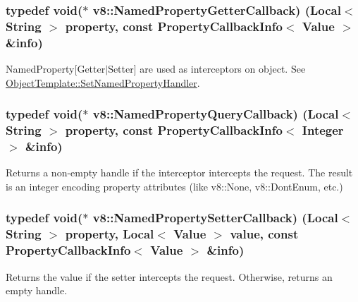\subsubsection[{\texorpdfstring{Named\+Property\+Getter\+Callback}{NamedPropertyGetterCallback}}]{\setlength{\rightskip}{0pt plus 5cm}typedef void($\ast$ v8\+::\+Named\+Property\+Getter\+Callback) ({\bf Local}$<$ {\bf String} $>$ property, const {\bf Property\+Callback\+Info}$<$ {\bf Value} $>$ \&info)}\hypertarget{namespacev8_a50cae386a68bf9ff23d02aa1161face4}{}\label{namespacev8_a50cae386a68bf9ff23d02aa1161face4}
Named\+Property\mbox{[}Getter$\vert$\+Setter\mbox{]} are used as interceptors on object. See \hyperlink{classv8_1_1_object_template_a66fa7b04c87676e20e35497ea09a0ad0}{Object\+Template\+::\+Set\+Named\+Property\+Handler}. 
\subsubsection[{\texorpdfstring{Named\+Property\+Query\+Callback}{NamedPropertyQueryCallback}}]{\setlength{\rightskip}{0pt plus 5cm}typedef void($\ast$ v8\+::\+Named\+Property\+Query\+Callback) ({\bf Local}$<$ {\bf String} $>$ property, const {\bf Property\+Callback\+Info}$<$ {\bf Integer} $>$ \&info)}\hypertarget{namespacev8_ac135beae5f0c8b290255accb438f990e}{}\label{namespacev8_ac135beae5f0c8b290255accb438f990e}
Returns a non-\/empty handle if the interceptor intercepts the request. The result is an integer encoding property attributes (like v8\+::\+None, v8\+::\+Dont\+Enum, etc.) 
\subsubsection[{\texorpdfstring{Named\+Property\+Setter\+Callback}{NamedPropertySetterCallback}}]{\setlength{\rightskip}{0pt plus 5cm}typedef void($\ast$ v8\+::\+Named\+Property\+Setter\+Callback) ({\bf Local}$<$ {\bf String} $>$ property, {\bf Local}$<$ {\bf Value} $>$ value, const {\bf Property\+Callback\+Info}$<$ {\bf Value} $>$ \&info)}\hypertarget{namespacev8_a9587769513971dc7cb301b740d9e66b6}{}\label{namespacev8_a9587769513971dc7cb301b740d9e66b6}
Returns the value if the setter intercepts the request. Otherwise, returns an empty handle. 
